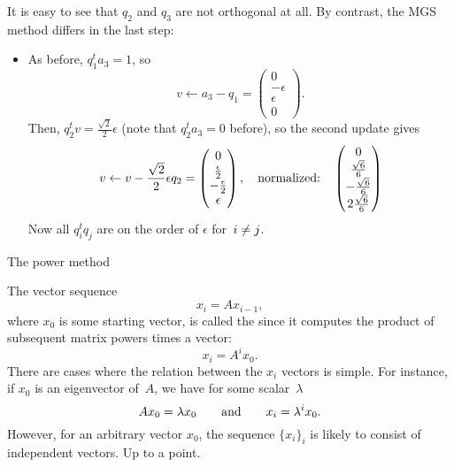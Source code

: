 It is easy to see that $q_2$ and $q_3$ are not orthogonal at all.
By contrast, the \ac{MGS} method differs in the last step:
\begin{itemize}
\item As before, $q_1^ta_3=1$, so
  \[ v\leftarrow a_3-q_1 = 
  \begin{pmatrix}
    0\\ -\epsilon\\ \epsilon\\ 0
  \end{pmatrix}.
  \]
  Then, $q_2^tv=\frac{\sqrt2}2\epsilon$ (note that $q_2^ta_3=0$
  before), so the second update gives
  \[ v\leftarrow v- \frac{\sqrt2}2\epsilon q_2=
  \begin{pmatrix}
    0\\ \frac\epsilon2\\ -\frac\epsilon2\\ \epsilon
  \end{pmatrix}
  ,\quad\hbox{normalized:}\quad
  \begin{pmatrix}
    0\\ \frac{\sqrt6}6\\ -\frac{\sqrt6}6\\ 2\frac{\sqrt6}6
  \end{pmatrix}
  \]
  Now all $q_i^tq_j$ are on the order of $\epsilon$
  for~$i\not=\nobreak j$.
\end{itemize}


 {The power method}
\label{app:power-method}

The vector sequence 
\[ x_i = Ax_{i-1}, \]
where $x_0$ is some starting vector, is called the  since it computes the product of subsequent matrix powers
times a vector:
\[ x_i = A^ix_0. \]
There are cases where the relation between the $x_i$ vectors is
simple. For instance, if $x_0$ is an eigenvector of~$A$, we have for
some scalar~$\lambda$
\[ Ax_0=\lambda x_0 \qquad\hbox{and}\qquad x_i=\lambda^i x_0. \]
However, for an arbitrary vector $x_0$, the sequence $\{x_i\}_i$ is
likely to consist of independent vectors. Up to a point.

